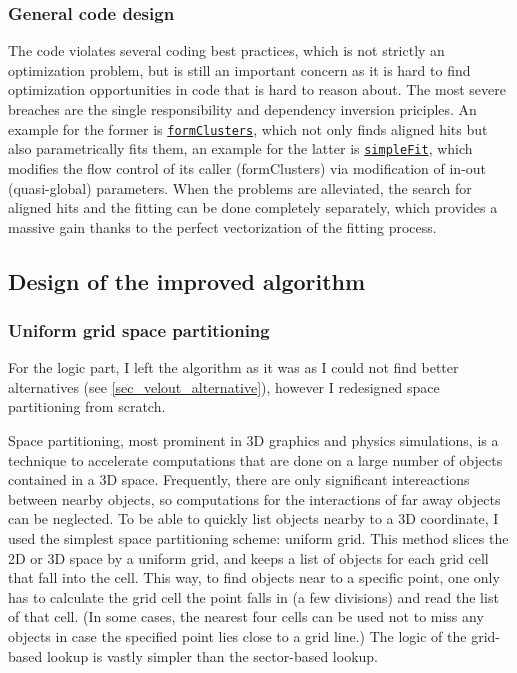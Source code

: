 \documentclass[12pt]{article}
\newcommand{\code}[1]{\texttt{#1}}
\begin{document}
\subsubsection{General code design}

The code violates several coding best practices, which is not strictly an optimization problem, but is still an important concern as it is hard to find optimization opportunities in code that is hard to reason about. The most severe breaches are the single responsibility and dependency inversion priciples. An example for the former is \href{https://gitlab.cern.ch/lhcb/Rec/blob/1b7edc5aea96f2225601238b3f64e478e41b6c70/Pr/PrVeloUT/src/PrVeloUT.cpp#L337}{\code{formClusters}}, which not only finds aligned hits but also parametrically fits them, an example for the latter is \href{https://gitlab.cern.ch/lhcb/Rec/blob/1b7edc5aea96f2225601238b3f64e478e41b6c70/Pr/PrVeloUT/src/PrVeloUT.h#L191}{\code{simpleFit}}, which modifies the flow control of its caller (formClusters) via modification of in-out (quasi-global) parameters. When the problems are alleviated, the search for aligned hits and the fitting can be done completely separately, which provides a massive gain thanks to the perfect vectorization of the fitting process.


\subsection{Design of the improved algorithm}

\subsubsection{Uniform grid space partitioning}\label{sec_velout_space_partitioning}

For the logic part, I left the algorithm as it was as I could not find better alternatives (see \ref{sec_velout_alternative}), however I redesigned space partitioning from scratch.
\vspace{1pc}

Space partitioning, most prominent in 3D graphics and physics simulations, is a technique to accelerate computations that are done on a large number of objects contained in a 3D space. Frequently, there are only significant intereactions between nearby objects, so computations for the interactions of far away objects can be neglected. To be able to quickly list objects nearby to a 3D coordinate, I used the simplest space partitioning scheme: uniform grid. This method slices the 2D or 3D space by a uniform grid, and keeps a list of objects for each grid cell that fall into the cell. This way, to find objects near to a specific point, one only has to calculate the grid cell the point falls in (a few divisions) and read the list of that cell. (In some cases, the nearest four cells can be used not to miss any objects in case the specified point lies close to a grid line.) The logic of the grid-based lookup is vastly simpler than the sector-based lookup.
\vspace{1pc}
\end{document}
